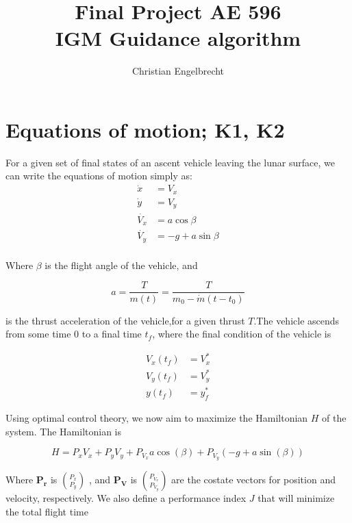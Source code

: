 \documentclass{article}
\begin{document}
\title{Final Project AE 596\\\large IGM Guidance algorithm}

\author{Christian Engelbrecht}


\maketitle

\newpage
\section{Equations of motion; K1, K2}

For a given set of final states of an ascent vehicle leaving the lunar surface, we can write the equations of motion simply as:\newline
\begin{align*}
\dot{x} &= V_x \\ 
\dot{y} &= V_y \\ 
\dot{V_x} &= a\cos{\beta} \\ 
\dot{V_y} &= -g + a\sin{\beta} \\ 
\end{align*}

Where $\beta$ is the flight angle of the vehicle, and

\begin{equation*} %
a = \frac{T}{m(t)} = \frac{T}{m_0 - \dot{m}(t - t_0)}
\end{equation*}

is the thrust acceleration of the vehicle,for a given thrust $T$.The vehicle ascends from some time 0 to a final time $t_f$, where the final condition of the vehicle is 

\begin{align*}
V_x(t_f) &= V_x^* \\
V_y(t_f) &= V_y^* \\
y(t_f) &= y_f^*
\end{align*}

Using optimal control theory, we now aim to maximize the Hamiltonian $H$ of the system. The Hamiltonian is 

\begin{equation*}
H = P_x V_x + P_yV_y + P_{V_{x}} a\cos(\beta) + P_{V_{y}}(-g +a\sin(\beta))
\end{equation*}

Where $\boldsymbol{P_r}$ is $\binom{P_x}{P_y}$ , and $\boldsymbol{P_V}$ is $\binom{P_{V_{x}}}{P_{V_{y}}}$ are the costate vectors for 
position and velocity, respectively. \newline
We also define a performance index $J$ that will minimize the total flight time 
\end{document}
